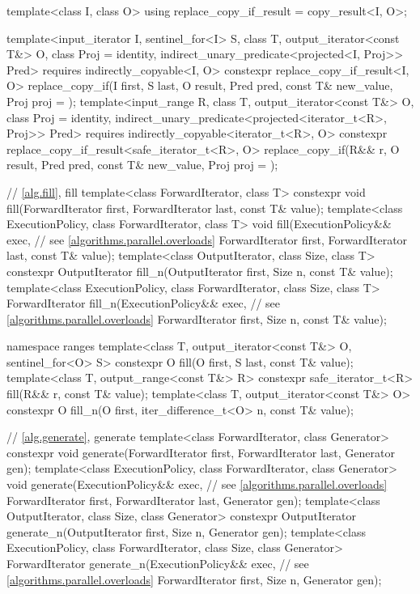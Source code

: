 \begin{codeblock}
{{    template<class I, class O>
    using replace_copy_if_result = copy_result<I, O>;

    template<input_iterator I, sentinel_for<I> S, class T, output_iterator<const T&> O,
             class Proj = identity, indirect_unary_predicate<projected<I, Proj>> Pred>
      requires indirectly_copyable<I, O>
      constexpr replace_copy_if_result<I, O>
        replace_copy_if(I first, S last, O result, Pred pred, const T& new_value,
                        Proj proj = {});
    template<input_range R, class T, output_iterator<const T&> O, class Proj = identity,
             indirect_unary_predicate<projected<iterator_t<R>, Proj>> Pred>
      requires indirectly_copyable<iterator_t<R>, O>
      constexpr replace_copy_if_result<safe_iterator_t<R>, O>
        replace_copy_if(R&& r, O result, Pred pred, const T& new_value,
                        Proj proj = {});
  }

  // \ref{alg.fill}, fill
  template<class ForwardIterator, class T>
    constexpr void fill(ForwardIterator first, ForwardIterator last, const T& value);
  template<class ExecutionPolicy, class ForwardIterator, class T>
    void fill(ExecutionPolicy&& exec,                           // see \ref{algorithms.parallel.overloads}
              ForwardIterator first, ForwardIterator last, const T& value);
  template<class OutputIterator, class Size, class T>
    constexpr OutputIterator fill_n(OutputIterator first, Size n, const T& value);
  template<class ExecutionPolicy, class ForwardIterator,
           class Size, class T>
    ForwardIterator fill_n(ExecutionPolicy&& exec,              // see \ref{algorithms.parallel.overloads}
                           ForwardIterator first, Size n, const T& value);

  namespace ranges {
    template<class T, output_iterator<const T&> O, sentinel_for<O> S>
      constexpr O fill(O first, S last, const T& value);
    template<class T, output_range<const T&> R>
      constexpr safe_iterator_t<R> fill(R&& r, const T& value);
    template<class T, output_iterator<const T&> O>
      constexpr O fill_n(O first, iter_difference_t<O> n, const T& value);
  }

  // \ref{alg.generate}, generate
  template<class ForwardIterator, class Generator>
    constexpr void generate(ForwardIterator first, ForwardIterator last,
                            Generator gen);
  template<class ExecutionPolicy, class ForwardIterator, class Generator>
    void generate(ExecutionPolicy&& exec,                       // see \ref{algorithms.parallel.overloads}
                  ForwardIterator first, ForwardIterator last,
                  Generator gen);
  template<class OutputIterator, class Size, class Generator>
    constexpr OutputIterator generate_n(OutputIterator first, Size n, Generator gen);
  template<class ExecutionPolicy, class ForwardIterator, class Size, class Generator>
    ForwardIterator generate_n(ExecutionPolicy&& exec,          // see \ref{algorithms.parallel.overloads}
                               ForwardIterator first, Size n, Generator gen);

}
\end{codeblock}
